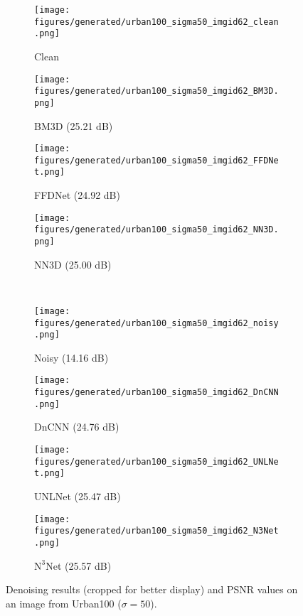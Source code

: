\documentclass{article}
\newcommand\nnn{\text{N}^3}
\begin{document}
\begin{figure*}[tb]
	\begin{subfigure}{0.225\linewidth}
	\texttt{[image: figures/generated/urban100\_sigma50\_imgid62\_clean.png]}
	\caption{Clean}
	\end{subfigure}
	\hfill
	\begin{subfigure}{0.225\linewidth}
	{\texttt{[image: figures/generated/urban100\_sigma50\_imgid62\_BM3D.png]}}
	\caption{BM3D (25.21 dB)}
	\end{subfigure}
	\hfill
	\begin{subfigure}{0.225\linewidth}
	\texttt{[image: figures/generated/urban100\_sigma50\_imgid62\_FFDNet.png]}
	\caption{FFDNet (24.92 dB)}
	\end{subfigure}
	\hfill
	\begin{subfigure}{0.225\linewidth}
	\texttt{[image: figures/generated/urban100\_sigma50\_imgid62\_NN3D.png]}
	\caption{NN3D (25.00 dB)}
	\end{subfigure}
	\\\begin{subfigure}{0.225\linewidth}
	\texttt{[image: figures/generated/urban100\_sigma50\_imgid62\_noisy.png]}
	\caption{Noisy (14.16 dB)}
	\end{subfigure}
	\hfill
	\begin{subfigure}{0.225\linewidth}
	\texttt{[image: figures/generated/urban100\_sigma50\_imgid62\_DnCNN.png]}
	\caption{DnCNN (24.76 dB)}
	\end{subfigure} 
	\hfill
	\begin{subfigure}{0.225\linewidth}
	\texttt{[image: figures/generated/urban100\_sigma50\_imgid62\_UNLNet.png]}
	\caption{UNLNet (25.47 dB)}
	\end{subfigure}
	\hfill
	\begin{subfigure}{0.225\linewidth}
	\texttt{[image: figures/generated/urban100\_sigma50\_imgid62\_N3Net.png]}
	\caption{$\nnn$Net (25.57 dB)}
	\end{subfigure}
\caption{Denoising results (cropped for better display) and PSNR values on an image from Urban100 ($\sigma=50$).}
\label{fig:denoising_urban100_s50_i62}
\vspace{-0.5em}
\end{figure*}
\end{document}
